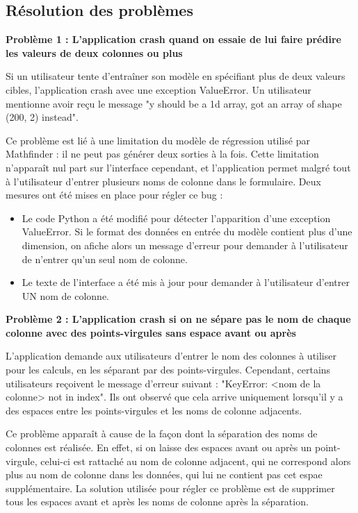 \documentclass[french]{article}
\begin{document}
    \subsection{Résolution des problèmes}
    \textbf{Problème 1 : L'application crash quand on essaie de lui faire prédire les valeurs de deux colonnes ou plus}

    Si un utilisateur tente d'entraîner son modèle en spécifiant plus de deux valeurs cibles, l'application crash avec une exception ValueError. Un utilisateur mentionne avoir reçu le message "y should be a 1d array, got an array of shape (200, 2) instead".

    Ce problème est lié à une limitation du modèle de régression utilisé par Mathfinder : il ne peut pas générer deux sorties à la fois. Cette limitation n'apparaît nul part sur l'interface cependant, et l'application permet malgré tout à l'utilisateur d'entrer plusieurs noms de colonne dans le formulaire. Deux mesures ont été mises en place pour régler ce bug :
    \begin{itemize}
        \item Le code Python a été modifié pour détecter l'apparition d'une exception ValueError. Si le format des données en entrée du modèle contient plus d'une dimension, on afiche alors un message d'erreur pour demander à l'utilisateur de n'entrer qu'un seul nom de colonne.
        \item Le texte de l'interface a été mis à jour pour demander à l'utilisateur d'entrer UN nom de colonne.
    \end{itemize}

    \textbf{Problème 2 : L'application crash si on ne sépare pas le nom de chaque colonne avec des points-virgules sans espace avant ou après}

    L'application demande aux utilisateurs d'entrer le nom des colonnes à utiliser pour les calculs, en les séparant par des points-virgules. Cependant, certains utilisateurs reçoivent le message d'erreur suivant : "KeyError: <nom de la colonne> not in index". Ils ont observé que cela arrive uniquement lorsqu'il y a des espaces entre les points-virgules et les noms de colonne adjacents.

    Ce problème apparaît à cause de la façon dont la séparation des noms de colonnes est réalisée. En effet, si on laisse des espaces avant ou après un point-virgule, celui-ci est rattaché au nom de colonne adjacent, qui ne correspond alors plus au nom de colonne dans les données, qui lui ne contient pas cet espae supplémentaire. La solution utilisée pour régler ce problème est de supprimer tous les espaces avant et après les noms de colonne après la séparation. 
\end{document}
